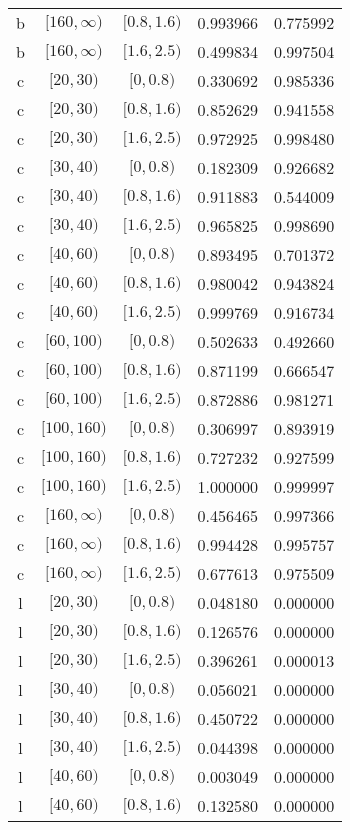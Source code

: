 \documentclass[12pt,a4paper]{article}
\begin{document}
\begin{table}[H]
\begin{center}
\begin{tabular}{ c | c | c | c | c }
		b & $[160,\infty)$ & $[0.8,1.6)$ & 0.993966 & 0.775992 \\
		b & $[160,\infty)$ & $[1.6,2.5)$ & 0.499834 & 0.997504 \\ \hline
		c & $[20,30)$ & $[0,0.8)$ & 0.330692 & 0.985336 \\
		c & $[20,30)$ & $[0.8,1.6)$ & 0.852629 & 0.941558 \\
		c & $[20,30)$ & $[1.6,2.5)$ & 0.972925 & 0.998480 \\
		c & $[30,40)$ & $[0,0.8)$ & 0.182309 & 0.926682 \\
		c & $[30,40)$ & $[0.8,1.6)$ & 0.911883 & 0.544009 \\
		c & $[30,40)$ & $[1.6,2.5)$ & 0.965825 & 0.998690 \\
		c & $[40,60)$ & $[0,0.8)$ & 0.893495 & 0.701372 \\
		c & $[40,60)$ & $[0.8,1.6)$ & 0.980042 & 0.943824 \\
		c & $[40,60)$ & $[1.6,2.5)$ & 0.999769 & 0.916734 \\
		c & $[60,100)$ & $[0,0.8)$ & 0.502633 & 0.492660 \\
		c & $[60,100)$ & $[0.8,1.6)$ & 0.871199 & 0.666547 \\
		c & $[60,100)$ & $[1.6,2.5)$ & 0.872886 & 0.981271 \\
		c & $[100,160)$ & $[0,0.8)$ & 0.306997 & 0.893919 \\
		c & $[100,160)$ & $[0.8,1.6)$ & 0.727232 & 0.927599 \\
		c & $[100,160)$ & $[1.6,2.5)$ & 1.000000 & 0.999997 \\
		c & $[160,\infty)$ & $[0,0.8)$ & 0.456465 & 0.997366 \\
		c & $[160,\infty)$ & $[0.8,1.6)$ & 0.994428 & 0.995757 \\
		c & $[160,\infty)$ & $[1.6,2.5)$ & 0.677613 & 0.975509 \\ \hline
		l & $[20,30)$ & $[0,0.8)$ & 0.048180 & 0.000000 \\
		l & $[20,30)$ & $[0.8,1.6)$ & 0.126576 & 0.000000 \\
		l & $[20,30)$ & $[1.6,2.5)$ & 0.396261 & 0.000013 \\
		l & $[30,40)$ & $[0,0.8)$ & 0.056021 & 0.000000 \\
		l & $[30,40)$ & $[0.8,1.6)$ & 0.450722 & 0.000000 \\
		l & $[30,40)$ & $[1.6,2.5)$ & 0.044398 & 0.000000 \\
		l & $[40,60)$ & $[0,0.8)$ & 0.003049 & 0.000000 \\
		l & $[40,60)$ & $[0.8,1.6)$ & 0.132580 & 0.000000 \\

\end{tabular}
\end{center}
\end{table}
\end{document}
